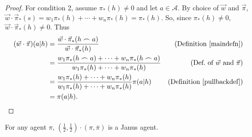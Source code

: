 \documentclass[runningheads]{llncs}
\begin{document}
\begin{proof}
        For condition 2,
        assume $\pi_*(h)\not=0$ and let $a\in\mathcal A$.
        By choice of $\vec w$ and $\vec\pi$,
        $\vec w\cdot\vec\pi_*(s)=w_1\pi_*(h)+\cdots+w_n\pi_*(h)=\pi_*(h)$.
        So, since $\pi_*(h)\not=0$, $\vec w\cdot\vec\pi_*(h)\not=0$.
        Thus
        \begin{align*}
            (\vec w\cdot\vec\pi)(a|h)
                &= \frac{\vec w\cdot \vec\pi_*(h\frown a)}{\vec w\cdot\vec\pi_*(h)}
                    &\mbox{(Definition \ref{maindefn})}\\
                &= \frac{w_1\pi_*(h\frown a)+\cdots+w_n\pi_*(h\frown a)}
                    {w_1\pi_*(h)+\cdots+w_n\pi_*(h)}
                    &\mbox{(Def.\ of $\vec w$ and $\vec\pi$)}\\
                &= \frac{w_1\pi_*(h)+\cdots+w_n\pi_*(h)}{w_1\pi_*(h)+\cdots+w_n\pi_*(h)}
                    \pi(a|h)
                    &\mbox{(Definition \ref{pullbackdef})}\\
                &= \pi(a|h).
        \end{align*}
\end{proof}

\begin{lemma}
\label{reflectionmakesjanuslemma}
    For any agent $\pi$,
    $(\frac12,\frac12)\cdot(\pi,\overline\pi)$ is a Janus agent.
\end{lemma}
\end{document}
